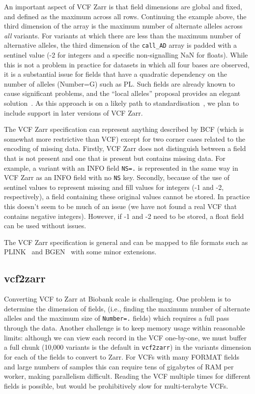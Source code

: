 \documentclass[a4paper,num-refs]{oup-contemporary}
\begin{document}
An important aspect of VCF Zarr is that field dimensions are 
global and fixed, and defined as the maximum across all rows.
Continuing the example above, the third dimension of the array 
is the maximum number of alternate alleles across \emph{all} 
variants. For variants at which there are less than the maximum
number of alternative alleles, the third dimension of the 
\texttt{call\_AD} array
is padded with a sentinel value (-2 for integers and a specific
non-signalling NaN for floats). While this is not a problem 
in practice for datasets in which all four bases are observed, 
it is a substantial issue for
fields that have a quadratic dependency on the number of alleles
(Number=G) such as PL. Such fields are already known to cause 
significant problems, and the ``local alleles'' proposal 
provides an elegant solution~\cite{poterba2024scalable}.
As this approach is on a likely path to 
standardisation~\cite{danecek2021twelve}, we plan to 
include support in later versions of VCF Zarr.

The VCF Zarr specification can represent anything described by BCF
(which is somewhat more restrictive than VCF) except for two corner
cases related to the encoding of missing data. Firstly, VCF Zarr does
not distinguish between a field that is not present and one that 
is present but contains missing data. For example, a variant with an
INFO field \texttt{NS=.} is represented in the same way in VCF Zarr
as an INFO field with no \texttt{NS} key. Secondly, because of the use
of sentinel values to represent missing and fill values for integers
(-1 and -2, respectively), a field containing these original values
cannot be stored. In practice this doesn't seem to be much of 
an issue (we have not found a real VCF that contains negative 
integers). However, if -1 and -2 need to be stored, a float field
can be used without issues.

The VCF Zarr specification is general and can be mapped to 
file formats such as PLINK~\citep{purcell2007plink,chang2015second}
and BGEN~\citep{band2018bgen} with some minor extensions.

\subsection{vcf2zarr}
Converting VCF to Zarr at Biobank scale is challenging. 
One problem is to determine the dimension of fields,
(i.e., finding the maximum number of alternate alleles and the 
maximum size of \texttt{Number=.} fields) which requires a full
pass through the data. Another challenge is to keep
memory usage within reasonable limits: although 
we can view each record in the VCF one-by-one,
we must buffer a full chunk (10,000 variants is the default in
\texttt{vcf2zarr}) 
in the variants dimension for each of the fields to convert to Zarr. 
For VCFs with many FORMAT fields and large numbers of samples this can
require tens of gigabytes of RAM per worker, making
parallelism difficult. Reading the VCF multiple times for different fields
is possible, but would be prohibitively slow for multi-terabyte VCFs.
\end{document}
